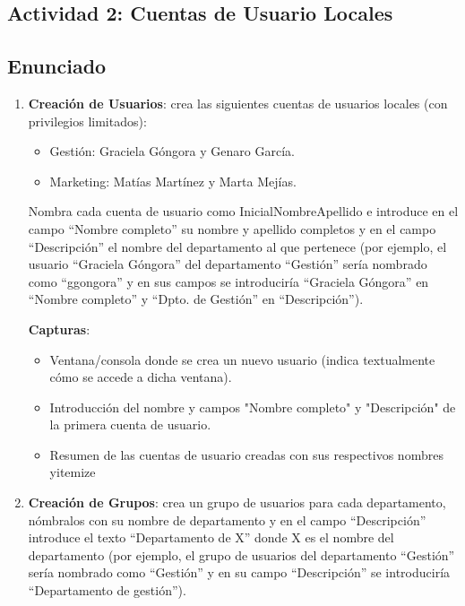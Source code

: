 \subsection{Actividad 2: Cuentas de Usuario Locales}

\subsection{Enunciado}

\begin{enumerate}[label=2.\alph*)]
    \item \textbf{Creación de Usuarios}: crea las siguientes cuentas de usuarios locales (con privilegios limitados):
    \begin{itemize}
        \item Gestión: Graciela Góngora y Genaro García.
        \item Marketing: Matías Martínez y Marta Mejías.
    \end{itemize}

    Nombra cada cuenta de usuario como InicialNombreApellido e introduce en el campo ``Nombre completo'' su nombre y apellido completos y en el campo ``Descripción'' el nombre del departamento al que pertenece (por ejemplo, el usuario ``Graciela Góngora'' del departamento ``Gestión'' sería nombrado como ``ggongora'' y en sus campos se introduciría ``Graciela Góngora'' en ``Nombre completo'' y ``Dpto. de Gestión'' en ``Descripción'').

    \textbf{Capturas}:
    \begin{itemize}
        \item Ventana/consola donde se crea un nuevo usuario (indica textualmente cómo se accede a dicha ventana).
        \item Introducción del nombre y campos "Nombre completo" y "Descripción" de la primera cuenta de usuario.
        \item Resumen de las cuentas de usuario creadas con sus respectivos nombres yitemize
    \end{itemize}

    \item \textbf{Creación de Grupos}: crea un grupo de usuarios para cada departamento, nómbralos con su nombre de departamento y en el campo ``Descripción'' introduce el texto ``Departamento de X'' donde X es el nombre del departamento (por ejemplo, el grupo de usuarios del departamento ``Gestión'' sería nombrado como ``Gestión'' y en su campo ``Descripción'' se introduciría ``Departamento de gestión'').


\end{enumerate}
